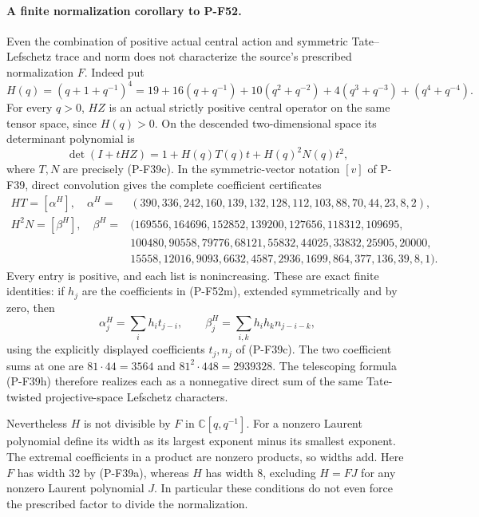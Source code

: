 \documentclass[11pt,a4paper]{article}
\begin{document}
\paragraph{A finite normalization corollary to P-F52.}
Even the combination of positive actual central action and symmetric
Tate--Lefschetz trace and norm does not characterize the source's
prescribed normalization $F$. Indeed put
\[
       H(q)=(q+1+q^{-1})^4
        =19+16(q+q^{-1})+10(q^2+q^{-2})
                    +4(q^3+q^{-3})+(q^4+q^{-4}).               \tag{P-F52m}
\]
For every $q>0$, $HZ$ is an actual strictly positive central
operator on the same tensor space, since $H(q)>0$.
On the descended two-dimensional space its determinant polynomial is
\[
             \det(I+tHZ)=1+H(q)T(q)t+H(q)^2N(q)t^2,             \tag{P-F52n}
\]
where $T,N$ are precisely (P-F39c).
In the symmetric-vector notation $[v]$ of P-F39, direct convolution
gives the complete coefficient certificates
\[
 \begin{split}
 HT=[\alpha^H],\quad
 \alpha^H={}&(390,336,242,160,139,132,128,112,103,88,70,44,23,8,2),\\
 H^2N=[\beta^H],\quad
 \beta^H={}&(169556,164696,152852,139200,127656,118312,109695,\\
 &100480,90558,79776,68121,55832,44025,33832,25905,20000,\\
 &15558,12016,9093,6632,4587,2936,1699,864,377,136,39,8,1).
 \end{split}                                                    \tag{P-F52o}
\]
Every entry is positive, and each list is nonincreasing.
These are exact finite identities: if $h_j$ are the coefficients
in (P-F52m), extended symmetrically and by zero, then
\[
 \alpha_j^H=\sum_i h_i t_{j-i},\qquad
 \beta_j^H=\sum_{i,k}h_ih_kn_{j-i-k},                           \tag{P-F52p}
\]
using the explicitly displayed coefficients $t_j,n_j$ of (P-F39c).
The two coefficient sums at one are $81\cdot44=3564$ and
$81^2\cdot448=2939328$. The telescoping formula (P-F39h)
therefore realizes each as a nonnegative direct sum of the same
Tate-twisted projective-space Lefschetz characters.

Nevertheless $H$ is not divisible by $F$ in
$\mathbb C[q,q^{-1}]$. For a nonzero Laurent polynomial define
its width as its largest exponent minus its smallest exponent.
The extremal coefficients in a product are nonzero products,
so widths add. Here $F$ has width $32$ by (P-F39a), whereas
$H$ has width $8$, excluding $H=FJ$ for any nonzero Laurent
polynomial $J$. In particular these conditions do not even
force the prescribed factor to divide the normalization.
\end{document}
